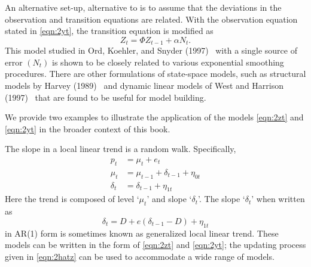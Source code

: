 An alternative set-up, alternative to is to assume that the deviations in the observation and transition equations are related. With the observation equation stated in \eqref{eqn:2yt}, the transition equation is modified as 
	\begin{equation} \label{eqn:223zt}
	Z_t = \Phi Z_{t-1} + \alpha N_t.
	\end{equation}
This model studied in Ord, Koehler, and Snyder (1997)~\cite{ord1997estimation} with a single source of error $(N_t)$ is shown to be closely related to various exponential smoothing procedures. There are other formulations of state-space models, such as structural models by Harvey (1989)~\cite{harvey1989kalman} and dynamic linear models of West and Harrison (1997)~\cite{west1997} that are found to be useful for model building.


We provide two examples to illustrate the application of the models \eqref{eqn:2zt} and \eqref{eqn:2yt} in the broader context of this book. 


\begin{ex}
The slope in a local linear trend is a random walk. Specifically,
	\begin{equation} \label{eqn:randomwalk}
	\begin{split}
	p_t&= \mu_t + e_t \\
	\mu_t&= \mu_{t-1} + \delta_{t-1} + \eta_{0t} \\
	\delta_t&= \delta_{t-1} + \eta_{1t}
	\end{split}
	\end{equation}
Here the trend is composed of level `$\mu_t$' and slope `$\delta_t$'. The slope `$\delta_t$' when written as 
	\begin{equation} \label{eqn:slopewritten}
	\delta_t= D+ e(\delta_{t-1} - D)+ \eta_{1t}
	\end{equation}
in AR(1) form is sometimes known as generalized local linear trend. These models can be written in the form of \eqref{eqn:2zt} and \eqref{eqn:2yt}; the updating process given in \eqref{eqn:2hatz} can be used to accommodate a wide range of models. \xqed
\end{ex}



